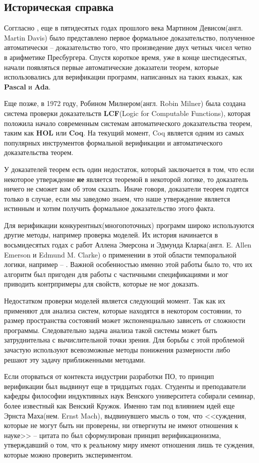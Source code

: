 \subsection{Историческая справка}

Соггласно \cite{omodeo2017martin}, еще в пятидесятых годах прошлого века Мартином Девисом(англ. Martin Davis) было представлено первое формальное доказательство, полученное автоматически -- доказательство того, что произведение двух четных чисел четно в арифметике Пресбургера. Спустя короткое время, уже в конце шестидесятых, начали появляться первые автоматические доказатели теорем, которые использовались для верификации программ, написанных на таких языках, как \textbf{Pascal} и \textbf{Ada}.

Еще позже, в 1972 году, Робином Милнером(англ. Robin Milner) была создана система проверки доказательств \textbf{LCF}(Logic for Computable Functions), которая положила начало современным системам автоматического доказательства теорем, таким как \textbf{HOL} или \textbf{Coq}. На текущий момент, Coq является одним из самых популярных инструментов формальной верификации и автоматического доказательства теорем.

У доказателей теорем есть один недостаток, который заключается в том, что если некоторое утверждение \textbf{не} является теоремой в некоторой логике, то доказатель ничего не сможет вам об этом сказать. Иначе говоря, доказатели теорем годятся только в случае, если мы заведомо знаем, что наше утверждение является истинным и хотим получить формальное доказательство этого факта.

Для верификации конкурентных(многопоточных) программ широко используются другие методы, например проверка моделей. Их история начинается в восьмидесятых годах с работ Аллена Эмерсона и Эдмунда Кларка(англ. E. Allen Emerson и Edmund M. Clarke) о применении в этой области темпоральной логики, например -- \cite{Clarke:1981:DSS:648063.747438}. Важной особенностью именно этой работы было то, что их алгоритм был пригоден для работы с частичными спецификациями и мог приводить контрпримеры для свойств, которые не мог доказать.

Недостатком проверки моделей является следующий момент. Так как их применяют для анализа систем, которые находятся в некотором состоянии, то размер пространства состояний может экспоненциально зависеть от сложности программы. Следовательно задача анализа такой системы может быть затруднительна с вычислительной точки зрения. Для борьбы с этой проблемой зачастую используют всевозможные методы понижения размерности либо решают эту задачу приближенными методами.

Если оторваться от контекста индустрии разработки ПО, то принцип верификации был выдвинут еще в тридцатых годах. Студенты и преподаватели кафедры философии индуктивных наук Венского университета собирали семинар, более известный как Венский Кружок. Именно там под влиянием идей еще Эрнста Маха(нем. Ernst Mach), выдвинувшего мысль о том, что <<суждения, которые не могут быть ни проверены, ни отвергнуты не имеют отношения к науке>> -- цитата по \cite{wiki:mach} был сформулирован принцип верификационизма, утверждавший о том, что к реальному миру имеют отношения лишь те суждения, которые можно проверить экспериментом.
